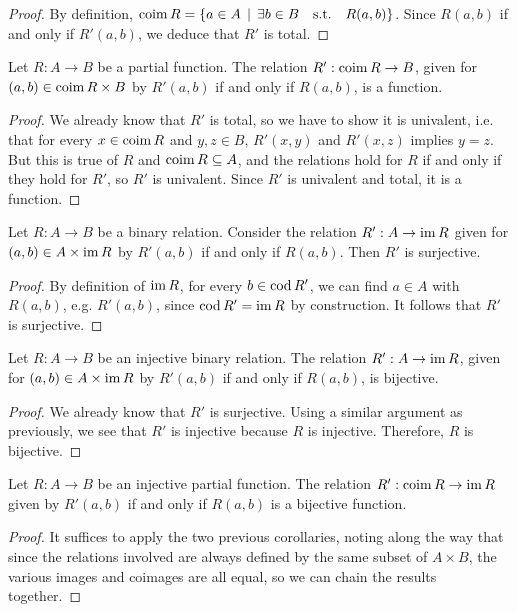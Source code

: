\begin{proof}
	By definition, $\operatorname{\mathrm{coim}} R = \{ a \in A \, \mid \, \exists b \in B \quad \text{s.t.} \quad R(a,b) \}$. Since $R(a,b)$ if and only if $R'(a,b)$, we deduce that $R'$ is total.
\end{proof}

\begin{corollary}
	Let $R : A \to B$ be a partial function. The relation $R' : \operatorname{\mathrm{coim}} R \to B$, given for $(a,b) \in \operatorname{\mathrm{coim}} R \times B$ by $R'(a,b)$ if and only if $R(a,b)$, is a function. 
\end{corollary}

\begin{proof}
	We already know that $R'$ is total, so we have to show it is univalent, i.e. that for every $x \in \operatorname{\mathrm{coim}} R$ and $y,z \in B$, $R'(x,y)$ and $R'(x,z)$ implies $y=z$. But this is true of $R$ and $\operatorname{\mathrm{coim}} R \subseteq A$, and the relations hold for $R$ if and only if they hold for $R'$, so $R'$ is univalent. Since $R'$ is univalent and total, it is a function.
\end{proof}

\begin{lemma}
	Let $R : A \to B$ be a binary relation. Consider the relation $R' : A \to \operatorname{\mathrm{im}} R$ given for $(a,b) \in A \times \operatorname{\mathrm{im}} R$ by $R'(a,b)$ if and only if $R(a,b)$. Then $R'$ is surjective.
\end{lemma}

\begin{proof}
	By definition of $\operatorname{\mathrm{im}} R$, for every $b \in \operatorname{\mathrm{cod}} R'$, we can find $a \in A$ with $R(a,b)$, e.g. $R'(a,b)$, since $\operatorname{\mathrm{cod}} R' = \operatorname{\mathrm{im}} R$ by construction. It follows that $R'$ is surjective.
\end{proof}

\begin{corollary}
	Let $R : A \to B$ be an injective binary relation. The relation $R' : A \to \operatorname{\mathrm{im}} R$, given for $(a,b) \in A \times \operatorname{\mathrm{im}} R$ by $R'(a,b)$ if and only if $R(a,b)$, is bijective.
\end{corollary}

\begin{proof}
	We already know that $R'$ is surjective. Using a similar argument as previously, we see that $R'$ is injective because $R$ is injective. Therefore, $R$ is bijective.
\end{proof}

\begin{corollary}
	Let $R : A \to B$ be an injective partial function. The relation $R' : \operatorname{\mathrm{coim}} R \to \operatorname{\mathrm{im}} R$ given by $R'(a,b)$ if and only if $R(a,b)$ is a bijective function.
\end{corollary}

\begin{proof}
	It suffices to apply the two previous corollaries, noting along the way that since the relations involved are always defined by the same subset of $A \times B$, the various images and coimages are all equal, so we can chain the results together.
\end{proof}
